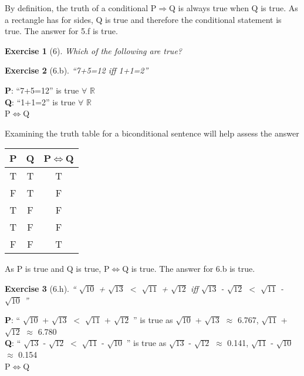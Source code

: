 \documentclass[11pt]{article}
\theoremstyle{quest}
\newtheorem*{exercise}{Exercise}
\begin{document}
By definition, the truth of a conditional P$\Rightarrow$Q is always true when Q 
is true. As a rectangle has for sides, Q is true and therefore the conditional 
statement is true. The answer for 5.f is true.

\newpage

\begin{exercise}[6]
Which of the following are true?
\end{exercise}
\begin{exercise}[6.b]
  ``7+5=12 iff 1+1=2''
\end{exercise}
\noindent \textbf{P}: ``7+5=12'' is true $\forall$ $\mathbb{R}$ \\
\textbf{Q}: ``1+1=2'' is true $\forall$ $\mathbb{R}$ \\
P$\Leftrightarrow$Q

Examining the truth table for a biconditional sentence will help assess the 
answer

\begin{table}[ht] 
\centering %
\begin{tabular}{c c c} %
\hline\hline %
P & Q & P$\Leftrightarrow$Q \\ [0.5ex] %
\hline %
T & T & T \\ %
F & T & F \\
T & F & F \\
T & F & F \\
F & F & T \\ [1ex] %
\hline %
\end{tabular} 
\end{table}

As P is true and Q is true, P$\Leftrightarrow$Q is true. The answer for 6.b is 
true.

\begin{exercise}[6.h]
  `` $\sqrt{10}$ + $\sqrt{13}$ $<$ $\sqrt{11}$ + $\sqrt{12}$ iff $\sqrt{13}$ - $\sqrt{12}$ $<$ $\sqrt{11}$ - $\sqrt{10}$ ''
\end{exercise}
\noindent \textbf{P}: `` $\sqrt{10}$ + $\sqrt{13}$ $<$ $\sqrt{11}$ + $\sqrt{12}$ '' is true as $\sqrt{10}$ + $\sqrt{13}$ $\approx$ 6.767, $\sqrt{11}$ + $\sqrt{12}$ $\approx$ 6.780 \\
\textbf{Q}: `` $\sqrt{13}$ - $\sqrt{12}$ $<$ $\sqrt{11}$ - $\sqrt{10}$ '' is true as $\sqrt{13}$ - $\sqrt{12}$ $\approx$ 0.141, $\sqrt{11}$ - $\sqrt{10}$ $\approx$ 0.154 \\
P$\Leftrightarrow$Q
\end{document}
